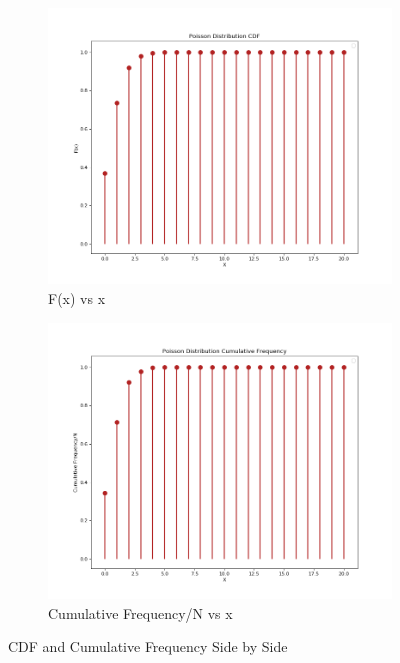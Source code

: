 \documentclass[12pt]{article}
\begin{document}
\begin{figure}[H]
	\centering
	\begin{subfigure}{.5\textwidth}
		\centering
		\includegraphics[scale=0.35]{Figures/cdf.png}
		\caption{F(x) vs x}
		\label{fig:fx}
	\end{subfigure}%
	\begin{subfigure}{.5\textwidth}
		\centering
		\includegraphics[scale=0.35]{Figures/cumfreq.png}
		\caption{Cumulative Frequency/N vs x}
		\label{fig:cumfreq}
	\end{subfigure}
	\caption{CDF and Cumulative Frequency Side by Side}
	\label{fig:test}
\end{figure}
\end{document}
